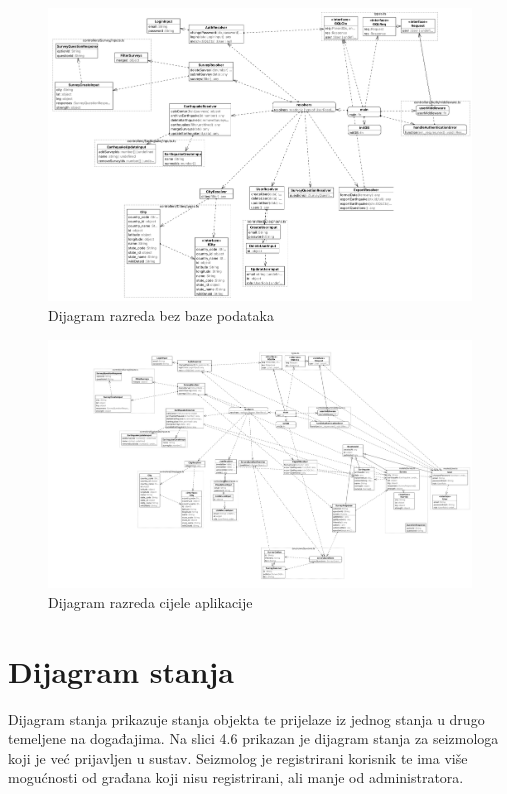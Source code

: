 			\begin{figure}[H]
				\includegraphics[width=\textwidth]{slike/classdiagram_no_db.png} 
				\caption{Dijagram razreda bez baze podataka}
				\label{fig:uml_no_db} 
			\end{figure}

			\begin{figure}[H]
				\includegraphics[width=\textwidth]{slike/classDiagram.png} 
				\caption{Dijagram razreda cijele aplikacije}
				\label{fig:uml} 
			\end{figure}

			\eject

		
		\section{Dijagram stanja}

		Dijagram stanja prikazuje stanja objekta te prijelaze iz jednog stanja u drugo temeljene na događajima. Na slici 4.6 prikazan je dijagram stanja za seizmologa koji je već prijavljen u sustav. Seizmolog je registrirani korisnik te ima više mogućnosti od građana koji nisu registrirani, ali manje od administratora. 
        
